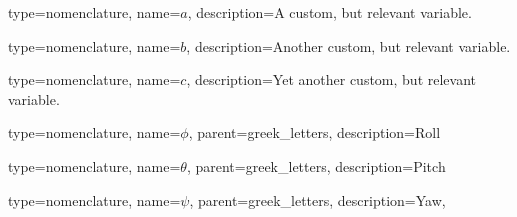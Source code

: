 {
	type=nomenclature,
	name={$a$},
	description={A custom, but relevant variable.}
}

{
	type=nomenclature,
	name={$b$},
	description={Another custom, but relevant variable.}
}

{
	type=nomenclature,
	name={$c$},
	description={Yet another custom, but relevant variable.}
}


{
	type=nomenclature,
	name={$\phi$},
	parent=greek_letters,
	description={Roll}
}

{
	type=nomenclature,
	name={$\theta$},
	parent=greek_letters,
	description={Pitch}
}

{
	type=nomenclature,
	name={$\psi$},
	parent=greek_letters,
	description={Yaw},
}



